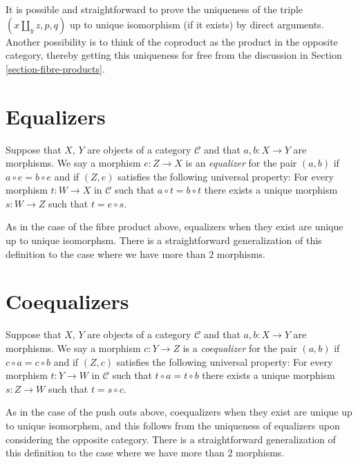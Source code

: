 \noindent
It is possible and straightforward to prove the uniqueness of the triple
$(x\amalg_y z, p, q)$ up to unique isomorphism (if it exists) by direct
arguments. Another possibility is to think of the coproduct as the
product in the opposite category, thereby getting this uniqueness for
free from the discussion in Section \ref{section-fibre-products}.

\section{Equalizers}
\label{section-equalizers}

\begin{definition}
\label{definition-equalizers}
Suppose that $X$, $Y$ are objects of a category $\mathcal{C}$
and that $a, b : X \to Y$ are morphisms. We say a morphism
$e : Z \to X$ is an {\it equalizer} for the pair $(a, b)$ if
$a \circ e = b \circ e$ and if $(Z, e)$ satisfies the following
universal property: For every morphism $t : W \to X$
in $\mathcal{C}$ such that $a \circ t = b \circ t$ there exists
a unique morphism $s : W \to Z$ such that $t = e \circ s$.
\end{definition}

\noindent
As in the case of the fibre product above, equalizers when
they exist are unique up to unique isomorphsm. There is a
straightforward generalization of this definition to the
case where we have more than $2$ morphisms.

\section{Coequalizers}
\label{section-coequalizers}

\begin{definition}
\label{definition-coequalizers}
Suppose that $X$, $Y$ are objects of a category $\mathcal{C}$
and that $a, b : X \to Y$ are morphisms. We say a morphism
$c : Y \to Z$ is a {\it coequalizer} for the pair $(a, b)$ if
$c \circ a = c \circ b$ and if $(Z, c)$ satisfies the following
universal property: For every morphism $t : Y \to W$
in $\mathcal{C}$ such that $t \circ a = t \circ b$ there exists
a unique morphism $s : Z \to W$ such that $t = s \circ c$.
\end{definition}

\noindent
As in the case of the push outs above, coequalizers when
they exist are unique up to unique isomorphsm, and this follows
from the uniqueness of equalizers upon considering the opposite
category. There is a straightforward generalization of this definition
to the case where we have more than $2$ morphisms.


